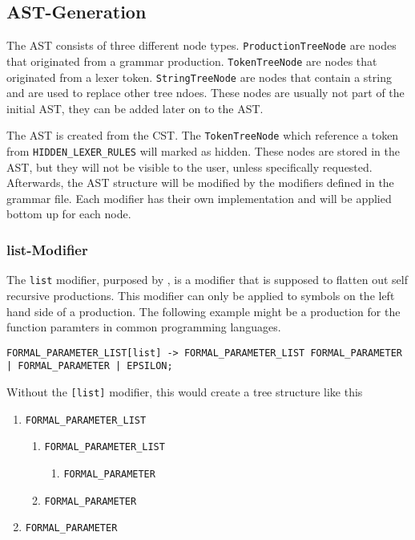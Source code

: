 \subsection{AST-Generation}

The AST consists of three different node types. \verb|ProductionTreeNode| are nodes that originated from a grammar production. \verb|TokenTreeNode| are nodes that originated from a lexer token. \verb|StringTreeNode| are nodes that contain a string and are used to replace other tree ndoes. These nodes are usually not part of the initial AST, they can be added later on to the AST.

The AST is created from the CST. The \verb|TokenTreeNode| which reference a token from \verb|HIDDEN_LEXER_RULES| will marked as hidden. These nodes are stored in the AST, but they will not be visible to the user, unless specifically requested. Afterwards, the AST structure will be modified by the modifiers defined in the grammar file. Each modifier has their own implementation and will be applied bottom up for each node.

\subsubsection{list-Modifier}

The \verb|list| modifier, purposed by \cite{GeneratingRewritableAST}, is a modifier that is supposed to flatten out self recursive productions. This modifier can only be applied to symbols on the left hand side of a production. The following example might be a production for the function paramters in common programming languages.

\begin{verbatim}
FORMAL_PARAMETER_LIST[list] -> FORMAL_PARAMETER_LIST FORMAL_PARAMETER | FORMAL_PARAMETER | EPSILON;
\end{verbatim}

Without the \verb|[list]| modifier, this would create a tree structure like this

\newpage

\begin{enumerate}
\item	\verb|FORMAL_PARAMETER_LIST|
\begin{enumerate}
\item	\verb|FORMAL_PARAMETER_LIST|
\begin{enumerate}
\item \verb|FORMAL_PARAMETER|
\end{enumerate}
\item \verb|FORMAL_PARAMETER|
\end{enumerate}
\item \verb|FORMAL_PARAMETER|
\end{enumerate}

